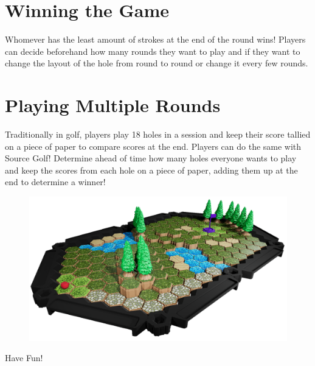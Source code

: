 \documentclass[../main.tex]{subfiles}
\begin{document}
\section{Winning the Game}
Whomever has the least amount of strokes at the end of the round wins! Players can decide beforehand how many rounds they want to play and if they want to change the layout of the hole from round to round or change it every few rounds. 

\section{Playing Multiple Rounds}
Traditionally in golf, players play 18 holes in a session and keep their score tallied on a piece of paper to compare scores at the end. Players can do the same with Source Golf! Determine ahead of time how many holes everyone wants to play and keep the scores from each hole on a piece of paper, adding them up at the end to determine a winner! 

\begin{figure}[h]
    \centering
    \includegraphics[width=1\linewidth]{chapters//Elevation.Putting.Winning/Source Golf full hole sideangle.png}   
\end{figure}

Have Fun! 
\end{document}
